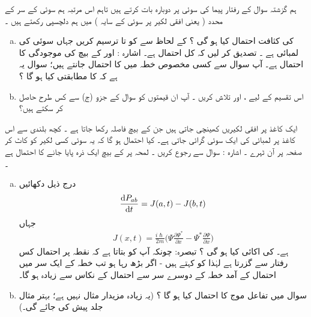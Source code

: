   ہم گزشتہ سوال کے رفتار پیما  کی سوئی پر دوبارہ بات کرتے ہیں  تاہم  اس  مرتبہ  ہم سوئی کے سر کے   محدد (   یعنی  افقی لکیر پر سوئی کے سایہ ) میں   ہم دلچسپی رکھتے ہیں ۔
\begin{enumerate}[a.]
\item  
    کی کثافت احتمال کیا ہو گی ؟   کے لحاظ  سے     کو   تا     ترسیم  کریں  جہاں   سوئی کی لمبائی ہے ۔ تصدیق کر لیں کہ کل  احتمال   ہے۔  اشارہ :    اور   کے بیچ    کی موجودگی کا  احتمال   ہے۔ آپ سوال   سے کسی مخصوص خطہ میں     کا  احتمال  جانتے ہیں؛  سوال یہ ہے کہ   کا  مطابقتی    کیا ہو گا ؟
\item
   اس تقسیم کے لیے ،   اور    تلاش کریں ۔ آپ ان قیمتوں کو سوال  کے جزو (ج) سے کس طرح حاصل کر سکتے ہیں؟
 \end{enumerate}
 ایک کاغذ پر افقی لکیریں کھینچی جاتی ہیں جن کے بیچ فاصلہ     رکھا جاتا ہے ۔ کچھ  بلندی سے اس کاغذ پر   لمبائی کی  ایک سوئی گرائی  جاتی ہے۔  کیا  احتمال  ہو گا کہ یہ  سوئی کسی   لکیر کو کاٹ کر  صفحہ  پر آن ٹہرے ۔ اشارہ : سوال   سے رجوع کریں ۔ 
 لمحہ   پر   کے بیچ ایک ذرہ   پایا جانے کا  احتمال   ہے ۔ 
\begin{enumerate}[a.]
\item
 درج ذیل دکھائیں
\begin{align*}
\frac{ \dif P_{ab} }{ \dif t } = J ( a , t ) - J ( b , t )
\end{align*}
جہاں 
\begin{align*}
J( x , t ) =  \frac{ i\hslash}{ 2 m } \big( \Psi \frac{  \partial \Psi^* }{ \partial x } - \Psi^* \frac{ \partial \Psi }{ \partial x } \big)
\end{align*}
ہے۔
 کی اکائی کیا ہو گی ؟   تبصرہ:  چونکہ  آپ کو بتاتا ہے کہ نقطہ   پر  احتمال  کس رفتار سے گزرتا ہے    لہٰذا    کو    کہتے ہیں - اگر  بڑھ رہا ہو تب  خطہ   کے ایک  سر  میں    احتمال  کے آمد خطہ  کے دوسرے سر سے     احتمال کے نکاس    سے زیادہ ہو گا۔  
\item
 سوال    میں تفاعل موج  کا  احتمال   کیا ہو گا ؟  (یہ زیادہ مزیدار مثال نہیں ہے؛  بہتر مثال جلد پیش کی جائے گی۔)
\end{enumerate}
